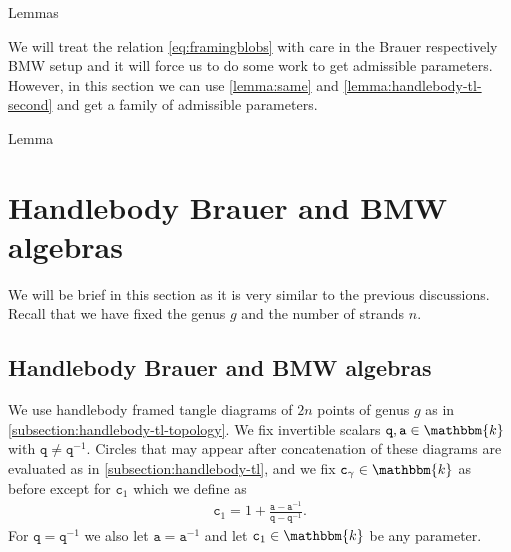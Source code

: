 \documentclass[a4paper,11pt]{amsart}
\newcommand{\KK}{\mathbbm{k}}
\newcommand{\varsym}[1]{\mathtt{#1}}
\newcommand{\qvar}{\varsym{q}}
\newcommand{\cvar}{\varsym{c}}
\newcommand{\avar}{\varsym{a}}
\numberwithin{equation}{section}
\let\fullref\autoref
\def\makeautorefname#1#2{\expandafter\def\csname#1autorefname\endcsname{#2}}
\begin{document}
\makeautorefname{lemma}{Lemmas}

\begin{remark}
We will treat the relation \eqref{eq:framingblobs} 
with care in the Brauer respectively BMW setup 
and it will force us to do 
some work to get admissible parameters. However, in this section 
we can use \fullref{lemma:same} and \ref{lemma:handlebody-tl-second} 
and get a family of admissible parameters.
\end{remark}

\makeautorefname{lemma}{Lemma}

\section{Handlebody Brauer and BMW algebras}\label{section:brauer}

We will be brief in this section as it is very similar 
to the previous discussions. Recall that we have fixed the genus $g$ and 
the number of strands $n$.

\subsection{Handlebody Brauer and BMW algebras}\label{subsection:BMW}

We use handlebody framed tangle 
diagrams of $2n$ points 
of genus $g$ as in \fullref{subsection:handlebody-tl-topology}.
We fix invertible scalars 
$\qvar,\avar\in\KK$ with $\qvar\neq\qvar^{-1}$.
Circles that may appear after concatenation of these diagrams 
are evaluated as in \fullref{subsection:handlebody-tl}, and we 
fix $\cvar_{\gamma}\in\KK$ as before except for 
$\cvar_{1}$ which we define as
\begin{gather*}
\cvar_{1}=1+\tfrac{\avar-\avar^{-1}}{\qvar-\qvar^{-1}}.
\end{gather*}
For $\qvar=\qvar^{-1}$ we also let $\avar=\avar^{-1}$
and let $\cvar_{1}\in\KK$ be any parameter.
\end{document}
